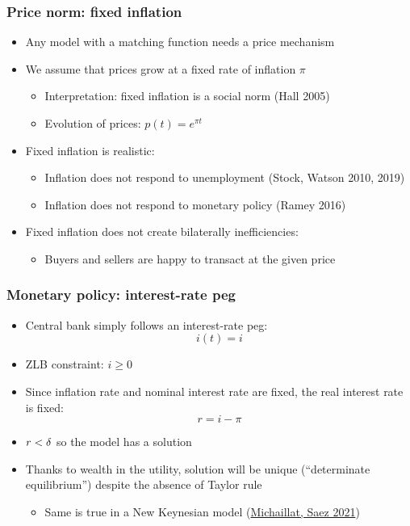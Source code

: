 \documentclass[11pt,aspectratio=169,xcolor={dvipsnames},hyperref={pdftex,pdfpagemode=UseNone,hidelinks,pdfdisplaydoctitle=true},usepdftitle=false]{beamer}
\begin{document}
\begin{frame}
\frametitle{Price norm: fixed inflation}
\begin{itemize}
\item Any model with a matching function needs a price mechanism
\item We assume that prices grow at a fixed rate of inflation $\pi$
\begin{itemize}
\item Interpretation: fixed inflation is a social norm (Hall 2005)
\item Evolution of prices: $p(t) = e^{\pi t}$
\end{itemize}
\item Fixed inflation is realistic:
\begin{itemize}
\item Inflation does not respond to unemployment (Stock, Watson 2010, 2019)
\item Inflation does not respond to monetary policy (Ramey 2016)
\end{itemize}
\item Fixed inflation does not create bilaterally inefficiencies: 
\begin{itemize}
\item Buyers and sellers are happy to transact at the given price
\end{itemize}
\end{itemize}    
\end{frame}

\begin{frame}
\frametitle{Monetary policy: interest-rate peg}
\begin{itemize}
\item Central bank simply follows an interest-rate peg:
\begin{equation*}
i(t) = i
\end{equation*}
\item ZLB constraint: $i \geq 0$
\item Since inflation rate and nominal interest rate are fixed, the real interest rate is fixed:
\begin{equation*}
r = i - \pi
\end{equation*}
\item  $r<\delta$ so the model has a solution
\item Thanks to wealth in the utility, solution will be unique (``determinate equilibrium'') despite the absence of Taylor rule
\begin{itemize}
\item Same is true in a New Keynesian model (\href{https://pascalmichaillat.org/11/}{Michaillat, Saez 2021})
\end{itemize}	
\end{itemize}
\end{frame}
\end{document}
